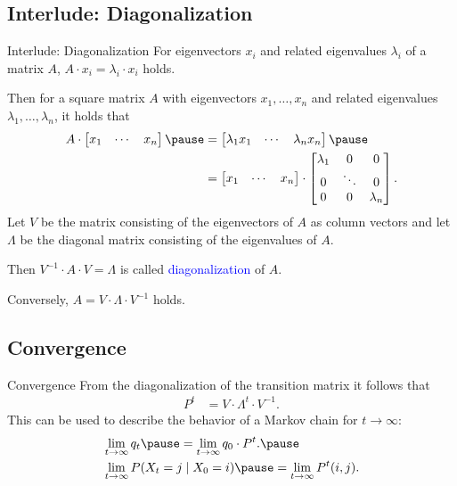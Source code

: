 \documentclass{beamer}
\def\spadding{\vspace{0.25cm}}
\def\b{\textcolor{blue}}
\begin{document}
\subsection{Interlude: Diagonalization}
\begin{frame}{Interlude: Diagonalization}
    For eigenvectors $x_i$ and related eigenvalues $\lambda_i$ of a matrix $A$, $A \cdot x_i = \lambda_i \cdot x_i$ holds.\pause\par\spadding
    Then for a square matrix $A$ with eigenvectors $x_1, \dots, x_n$ and related eigenvalues $\lambda_1, \dots, \lambda_n$\pause, it holds that
    \begin{align*}
        A \cdot \begin{bmatrix}
            x_1 & \cdots & x_n
        \end{bmatrix}\pause &= \begin{bmatrix}
            \lambda_1 x_1 & \cdots & \lambda_n x_n
        \end{bmatrix}\pause \\
        &= \begin{bmatrix}
            x_1 & \cdots & x_n
        \end{bmatrix} \cdot \begin{bmatrix}
            \lambda_1 & 0 & 0 \\
            0 & \ddots & 0 \\
            0 & 0 & \lambda_n
        \end{bmatrix}.
    \end{align*}\pause
    Let $V$ be the matrix consisting of the eigenvectors of $A$ as column vectors and let $\Lambda$ be the diagonal matrix consisting of the eigenvalues of $A$.\pause\par\spadding
    Then $V^{-1} \cdot A \cdot V = \Lambda$ is called \b{diagonalization} of $A$.\pause\par
    Conversely, $A = V \cdot \Lambda \cdot V^{-1}$ holds.
\end{frame}

\subsection{Convergence}
\begin{frame}{Convergence}
    From the diagonalization of the transition matrix it follows that
    \begin{align*}
                                     P^t &= V \cdot \Lambda^t \cdot V^{-1}.
    \end{align*}\pause
    This can be used to describe the behavior of a Markov chain for $t \to \infty$:
    \begin{align*}
        &\lim_{t \to \infty} q_t\pause = \lim_{t \to \infty} q_0 \cdot P^t.\pause \\
        &\lim_{t \to \infty} P(X_t = j \mid X_0 = i)\pause = \lim_{t \to \infty} P^t(i,j).
    \end{align*}
\end{frame}
\end{document}
